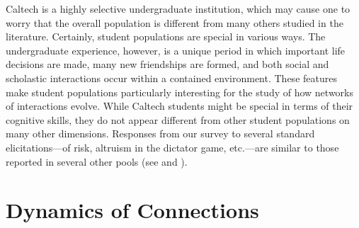 \documentclass[12pt,letterpaper,english]{article}
\begin{document}
Caltech is a highly selective undergraduate institution, which may cause one to worry that the overall population is different from many others studied in the literature. Certainly, student populations are special in various ways. The undergraduate experience, however, is a unique period in which important life decisions are made, many new friendships are formed, and both social and scholastic interactions occur within a contained environment. These features make student populations particularly interesting for the study of how networks of interactions evolve. While Caltech students might be special in terms of their cognitive skills, they do not appear different from other student populations on many other dimensions. Responses from our survey to several standard elicitations---of risk, altruism in the dictator game, etc.---are similar to those reported in several other pools (see \citealt{gillen2019experimenting} and \citealt{snowberg2018testing}).










\section{Dynamics of Connections}
\label{sec:data}
\end{document}
